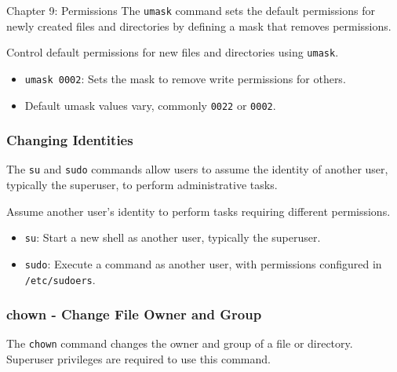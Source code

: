 \begin{notes}{Chapter 9: Permissions}
    The \texttt{umask} command sets the default permissions for newly created files and directories by defining a mask that removes permissions.
    
    \begin{highlight}
    
    Control default permissions for new files and directories using \texttt{umask}.
    
    \begin{itemize}
        \item \texttt{umask 0002}: Sets the mask to remove write permissions for others.
        \item Default umask values vary, commonly \texttt{0022} or \texttt{0002}.
    \end{itemize}
    
    \end{highlight}
    
    \subsubsection*{Changing Identities}
    
    The \texttt{su} and \texttt{sudo} commands allow users to assume the identity of another user, typically the superuser, to perform administrative tasks.
    
    \begin{highlight}
    
    Assume another user's identity to perform tasks requiring different permissions.
    
    \begin{itemize}
        \item \texttt{su}: Start a new shell as another user, typically the superuser.
        \item \texttt{sudo}: Execute a command as another user, with permissions configured in \texttt{/etc/sudoers}.
    \end{itemize}
    
    \end{highlight}
    
    \subsubsection*{chown - Change File Owner and Group}
    
    The \texttt{chown} command changes the owner and group of a file or directory. Superuser privileges are required to use this command.
    

\end{notes}
